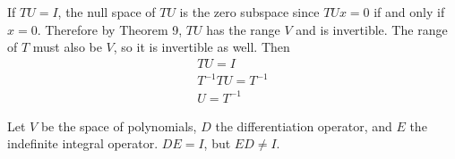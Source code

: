 \documentclass{article}
\begin{document}
\begin{enumerate}[listparindent=\parindent]
    If \(TU = I\), the null space of \(TU\) is the zero subspace since \(TUx = 0\) if and only if \(x = 0\).
    Therefore by Theorem 9, \(TU\) has the range \(V\) and is invertible.
    The range of \(T\) must also be \(V\), so it is invertible as well. Then
    \begin{gather*}
        TU = I \\
        T^{-1}TU = T^{-1} \\
        U = T^{-1}
    \end{gather*}

    Let \(V\) be the space of polynomials, \(D\) the differentiation operator, and \(E\) the indefinite integral operator.
    \(DE = I\), but \(ED \neq I\).

\end{enumerate}
\end{document}
